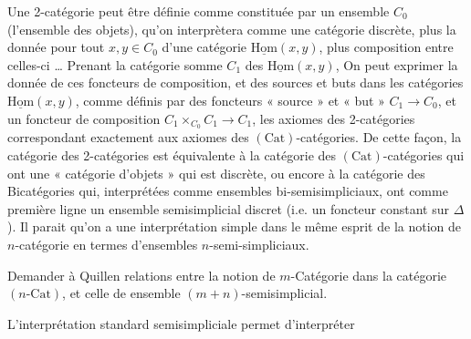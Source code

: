 \documentclass[11pt,a4paper]{article}
\begin{document}
Une 2-catégorie peut être définie comme constituée par un ensemble
$C_0$ (l'ensemble des objets), qu'on interprètera comme une catégorie
discrète, plus la donnée pour tout $x, y \in C_0$ d'une catégorie
$\underline{\mathrm{Hom}}(x,y)$, plus  composition entre
celles-ci … Prenant la catégorie somme $C_1$ des
$\underline{\mathrm{Hom}}(x,y)$, On peut exprimer la donnée de ces
foncteurs de composition, et des sources et buts  dans les
catégories $\underline{\mathrm{Hom}}(x,y)$, comme définis par des foncteurs
« source » et « but » $C_1 \to C_0$, et un foncteur de composition
$C_1 \times_{C_0} C_1 \to C_1$, les axiomes des 2-catégories correspondant
exactement aux axiomes des $(\mathrm{Cat})$-catégories. De cette façon, la
catégorie des 2-catégories est équivalente à la catégorie des
$(\mathrm{Cat})$-catégories qui ont une « catégorie d'objets » qui est
discrète, ou encore à la catégorie des Bicatégories qui, interprétées comme
ensembles bi-semisimpliciaux, ont comme première ligne un ensemble
semisimplicial discret (i.e. un foncteur constant sur $\Delta$). Il parait
qu'on a une interprétation simple dans le même esprit de la notion de
$n$-catégorie en termes d'ensembles $n$-semi-simpliciaux.

Demander à Quillen relations entre la notion de $m$-Catégorie dans la
catégorie $(n\text{-Cat})$, et celle de ensemble
$(m{+}n)$-semisimplicial.

L'interprétation standard semisimpliciale permet d'interpréter

\end{document}
